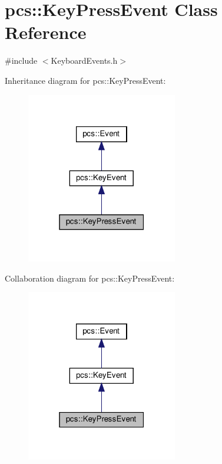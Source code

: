 \hypertarget{classpcs_1_1KeyPressEvent}{}\section{pcs\+:\+:Key\+Press\+Event Class Reference}
\label{classpcs_1_1KeyPressEvent}


{\ttfamily \#include $<$Keyboard\+Events.\+h$>$}



Inheritance diagram for pcs\+:\+:Key\+Press\+Event\+:\nopagebreak
\begin{figure}[H]
\begin{center}
\leavevmode
\includegraphics[width=187pt]{classpcs_1_1KeyPressEvent__inherit__graph}
\end{center}
\end{figure}


Collaboration diagram for pcs\+:\+:Key\+Press\+Event\+:\nopagebreak
\begin{figure}[H]
\begin{center}
\leavevmode
\includegraphics[width=187pt]{classpcs_1_1KeyPressEvent__coll__graph}
\end{center}
\end{figure}

